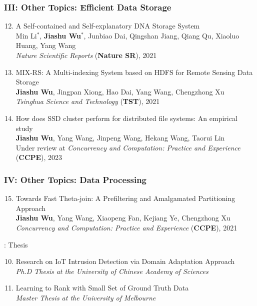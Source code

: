 \documentclass[letterpaper,11pt]{article}
\newcommand{\RNum}[1]{\uppercase\expandafter{\romannumeral #1\relax}}
\begin{document}
\subsubsection*{III: Other Topics: Efficient Data Storage}
\begin{enumerate}
  \setcounter{enumi}{11}
  \item A Self-contained and Self-explanatory DNA Storage System\\
  Min Li$^*$, \textbf{Jiashu Wu$^*$}, Junbiao Dai, Qingshan Jiang, Qiang Qu, Xiaoluo Huang, Yang Wang\textsuperscript{\Letter}\\
  \textit{Nature Scientific Reports} (\textbf{Nature SR}), 2021

  \item MIX-RS: A Multi-indexing System based on HDFS for Remote Sensing Data Storage\\
  \textbf{Jiashu Wu}, Jingpan Xiong, Hao Dai, Yang Wang\textsuperscript{\Letter}, Chengzhong Xu\\
  \textit{Tsinghua Science and Technology} (\textbf{TST}), 2021

  \item How does SSD cluster perform for distributed file systems: An empirical study\\
  \textbf{Jiashu Wu}, Yang Wang\textsuperscript{\Letter}, Jinpeng Wang, Hekang Wang, Taorui Lin\\
  Under review at \textit{Concurrency and Computation: Practice and Experience} (\textbf{CCPE}), 2023
\end{enumerate}

\subsubsection*{IV: Other Topics: Data Processing}
\begin{enumerate}
  \setcounter{enumi}{14}
  \item Towards Fast Theta-join: A Prefiltering and Amalgamated Partitioning Approach\\
  \textbf{Jiashu Wu}, Yang Wang\textsuperscript{\Letter}, Xiaopeng Fan, Kejiang Ye, Chengzhong Xu\\
  \textit{Concurrency and Computation: Practice and Experience} (\textbf{CCPE}), 2021
\end{enumerate}
\fi

\RNum{2}: Thesis
\begin{enumerate}
  \setcounter{enumi}{9}
  \item Research on IoT Intrusion Detection via Domain Adaptation Approach\\
  \textit{Ph.D Thesis at the University of Chinese Academy of Sciences}

  \item Learning to Rank with Small Set of Ground Truth Data\\
  \textit{Master Thesis at the University of Melbourne}
\end{enumerate}
\end{document}
